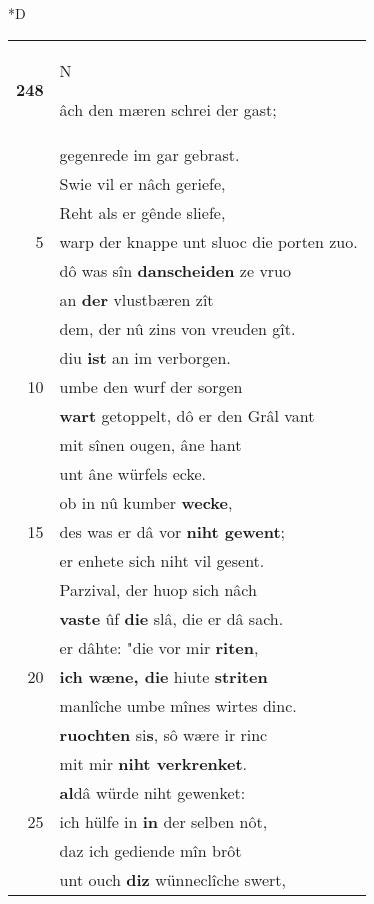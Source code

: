 \documentclass[8pt,a4paper,notitlepage]{article}
\begin{document}
\begin{table}[ht]
\begin{minipage}[t]{0.5\linewidth}
\small
\begin{center}*D
\end{center}
\begin{tabular}{rl}
\textbf{248} & \begin{large}N\end{large}âch den mæren schrei der gast;\\ 
 & gegenrede im gar gebrast.\\ 
 & Swie vil er nâch geriefe,\\ 
 & Reht als er gênde sliefe,\\ 
5 & warp der knappe unt sluoc die porten zuo.\\ 
 & dô was sîn \textbf{danscheiden} ze vruo\\ 
 & an \textbf{der} vlustbæren zît\\ 
 & dem, der nû zins von vreuden gît.\\ 
 & diu \textbf{ist} an im verborgen.\\ 
10 & umbe den wurf der sorgen\\ 
 & \textbf{wart} getoppelt, dô er den Grâl vant\\ 
 & mit sînen ougen, âne hant\\ 
 & unt âne würfels ecke.\\ 
 & ob in nû kumber \textbf{wecke},\\ 
15 & des was er dâ vor \textbf{niht gewent};\\ 
 & er enhete sich niht vil gesent.\\ 
 & Parzival, der huop sich nâch\\ 
 & \textbf{vaste} ûf \textbf{die} slâ, die er dâ sach.\\ 
 & er dâhte: "die vor mir \textbf{riten},\\ 
20 & \textbf{ich wæne, die} hiute \textbf{striten}\\ 
 & manlîche umbe mînes wirtes dinc.\\ 
 & \textbf{ruochten} si\textbf{s}, sô wære ir rinc\\ 
 & mit mir \textbf{niht verkrenket}.\\ 
 & \textbf{al}dâ würde niht gewenket:\\ 
25 & ich hülfe in \textbf{in} der selben nôt,\\ 
 & daz ich gediende mîn brôt\\ 
 & unt ouch \textbf{diz} wünneclîche swert,\\ 

\end{tabular}
\end{minipage}
\end{table}
\end{document}
